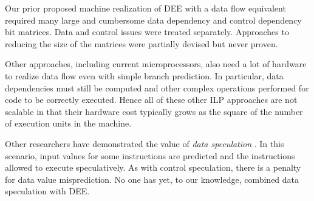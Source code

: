 \documentclass[10pt,dvips]{article}
\begin{document}
Our prior proposed machine realization of DEE with a data flow equivalent
required many large
and cumbersome data dependency and control dependency bit matrices. Data and control
issues were treated separately. Approaches to reducing the size of the
matrices were partially devised but never proven.

Other approaches, including current microprocessors, also need a lot of hardware to
realize data flow even with simple branch prediction. In particular, data dependencies
must still be computed and other complex operations performed for code to be correctly
executed. Hence all of these other ILP approaches are not scalable in that
their hardware cost typically grows as the square of the number of execution units in
the machine.

Other researchers have demonstrated the value of {\it data speculation}
\cite{Lipasti96,Sazeides96}.
In this scenario, input values for some instructions are predicted and the
instructions allowed to execute speculatively. As with control speculation,
there is a penalty for data value misprediction.
No one has yet, to our knowledge, combined data speculation with DEE.
\end{document}
